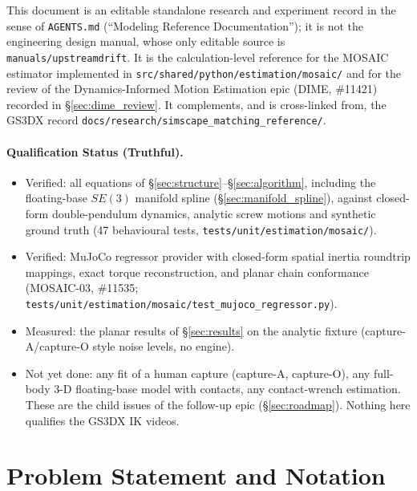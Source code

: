 \documentclass[11pt,a4paper]{article}
\begin{document}
This document is an editable standalone research and experiment record in the
sense of \texttt{AGENTS.md} (``Modeling Reference Documentation''); it is not
the engineering design manual, whose only editable source is
\texttt{manuals/upstreamdrift}.  It is the calculation-level reference for the
MOSAIC estimator implemented in
\texttt{src/shared/python/estimation/mosaic/} and for the review of the
Dynamics-Informed Motion Estimation epic (DIME, \#11421) recorded in
\S\ref{sec:dime_review}.  It complements, and is cross-linked from, the GS3DX
record \texttt{docs/research/simscape\_matching\_reference/}.

\paragraph{Qualification Status (Truthful).}
\begin{itemize}[nosep]
  \item Verified: all equations of \S\ref{sec:structure}--\S\ref{sec:algorithm},
    including the floating-base $SE(3)$ manifold spline (\S\ref{sec:manifold_spline}),
    against closed-form double-pendulum dynamics, analytic screw motions and synthetic ground truth
    (47 behavioural tests, \texttt{tests/unit/estimation/mosaic/}).
  \item Verified: MuJoCo regressor provider with closed-form spatial inertia
    roundtrip mappings, exact torque reconstruction, and planar chain conformance
    (MOSAIC-03, \#11535; \texttt{tests/unit/estimation/mosaic/test\_mujoco\_regressor.py}).
  \item Measured: the planar results of \S\ref{sec:results} on the analytic
    fixture (capture-A/capture-O style noise levels, no engine).
  \item Not yet done: any fit of a human capture (capture-A, capture-O), any
    full-body 3-D floating-base model with contacts, any contact-wrench estimation.  These are the child issues of the follow-up epic
    (\S\ref{sec:roadmap}).  Nothing here qualifies the GS3DX IK videos.
\end{itemize}

\section{Problem Statement and Notation}
\label{sec:problem}
\end{document}
